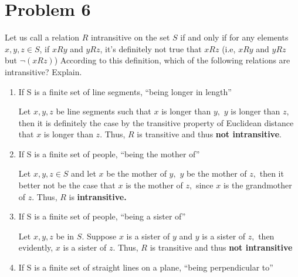 \documentclass[11pt]{article}
\begin{document}
\section*{Problem 6}
\begin{problem}
    Let us call a relation $R$ intransitive on the set $S$ if and only if for any elements $x, y, z \in S$, if $xRy$ and $yRz$, it’s definitely not true that $xRz$ (i.e, $xRy$ and $yRz$ but $\neg (xRz)$) According to this definition, which of the
following relations are intransitive? Explain.
\end{problem}
\begin{enumerate}
    \item 
    \begin{problem}
        If S is a finite set of line segments, “being longer in length”
    \end{problem}
    \begin{solution}
        Let $x,y,z$ be line segments such that $x$ is longer than $y,$ $y$ is longer than $z,$ then it is definitely the case by the transitive property of Euclidean distance that $x$ is longer than $z.$ Thus, $R$ is {transitive} and thus \textbf{not intransitive}.
    \end{solution}
    \item 
    \begin{problem}
        If S is a finite set of people, “being the mother of”
    \end{problem}
    \begin{solution}
        Let $x,y,z\in S$ and let $x$ be the mother of $y,$ $y$ be the mother of $z,$ then it better not be the case that $x$ is the mother of $z,$ since $x$ is the grandmother of $z.$ Thus, $R$ is \textbf{intransitive.}
    \end{solution}
    \item 
    \begin{problem}
        If S is a finite set of people, “being a sister of”
    \end{problem}
    \begin{solution}
        Let $x,y,z$ be in $S.$ Suppose $x$ is a sister of $y$ and $y$ is a sister of $z,$ then evidently, $x$ is a sister of $z.$ Thus, $R$ is {transitive} and thus \textbf{not intransitive}
    \end{solution}
    \item 
    \begin{problem}
        If S is a finite set of straight lines on a plane, “being perpendicular to”
    \end{problem}

\end{enumerate}
\end{document}

